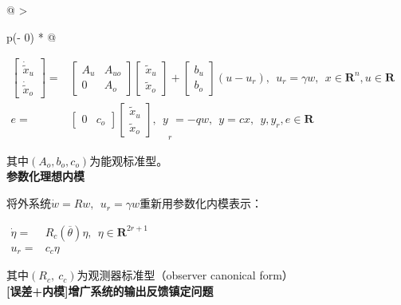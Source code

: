 \documentclass[
  12pt,
  a4paper
]{article}
\begin{document}
\begin{longtable}[]{@{}
  >{\raggedright\arraybackslash}p{}@{}}
\(\begin{aligned}
\begin{bmatrix}
{\dot{\widetilde{x}}}_{u} \\
{\dot{\widetilde{x}}}_{o}
\end{bmatrix} = & \begin{bmatrix}
A_{u} & A_{uo} \\
0 & A_{o}
\end{bmatrix}\begin{bmatrix}
{\widetilde{x}}_{u} \\
{\widetilde{x}}_{o}
\end{bmatrix} + \begin{bmatrix}
b_{u} \\
b_{o}
\end{bmatrix}(u - u_{r}),\ \ u_{r} = \gamma w,\ \ x \in \mathbf{R}^{n},u \in \mathbf{R} \\
e = & {\begin{bmatrix}
0 & c_{o}
\end{bmatrix}\begin{bmatrix}
{\widetilde{x}}_{u} \\
{\widetilde{x}}_{o}
\end{bmatrix},\ \ y}_{r} = - qw,\ \ y = cx,\ \ y,y_{r},e \in \mathbf{R}
\end{aligned}\)

其中\((A_{o},b_{o},c_{o})\)为能观标准型。 \\
\textbf{参数化理想内模}

将外系统\(\dot{w} = Rw,\ \ u_{r} = \gamma w\)重新用参数化内模表示：

\(\begin{aligned}
\dot{\eta} = & R_{c}\left( \overline{\theta} \right)\eta,\ \ \eta \in \mathbf{R}^{2r + 1} \\
u_{r} = & c_{c}\eta
\end{aligned}\)

其中\((R_{c},\ c_{c})\)为观测器标准型（observer canonical form） \\
\textbf{{[}误差+内模{]}增广系统的输出反馈镇定问题}


\end{longtable}
\end{document}
